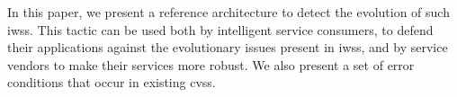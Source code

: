 










In this paper, we present a reference architecture to detect the evolution of such \glspl{iws}. This tactic can be used both by intelligent service consumers, to defend their applications against the evolutionary issues present in \glspl{iws}, and by service vendors to make their services more robust. We also present a set of error conditions that occur in existing \glspl{cvs}.  







